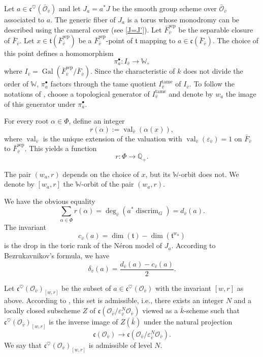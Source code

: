 \documentclass[12pt,english]{smfart}
\numberwithin{equation}{subsection}
\theoremstyle{remark}
\begin{document}
Let $a\in\mathfrak{c}^\heartsuit(\bar{\mathcal{O}}_{\bar{v}})$ and let $J_a=a^*J$ be the smooth group scheme over $\bar{\mathcal{O}}_{\bar{v}}$ associated to $a$. The generic fiber of $J_a$ is a torus whose monodromy can be described using the cameral cover (see \ref{J=J'}). Let $\bar F_{\bar{v}}^{\mathrm{sep}}$ be the separable closure of $\bar F_{\bar{v}}$. Let $x\in \mathfrak{t}(\bar F_{\bar{v}}^{\mathrm{sep}})$ be a $\bar F_{\bar{v}}^{\mathrm{sep}}$-point of $\mathfrak{t}$ mapping to $a\in \mathfrak{c}(\bar F_{\bar{v}})$. The choice of this point defines a homomorphism
$$\pi_a^\bullet: I_{\bar{v}} \longrightarrow \mathbb{W},$$
where $I_{\bar{v}}=\operatorname{Gal}(\bar F_{\bar{v}}^{\mathrm{sep}}/\bar F_{\bar{v}})$. Since the characteristic of $k$ does not divide the order of $\mathbb{W}$, $\pi_a^\bullet$ factors through the tame quotient $I_{\bar{v}}^{\mathrm{tame}}$ of $I_{\bar{v}}$. To follow the notations of \cite{GKM-codim}, choose a topological generator of $I_{\bar{v}}^{\mathrm{tame}}$ and denote by $w_a$ the image of this generator under $\pi_a^\bullet$.

For every root $\alpha\in \Phi$, define an integer
$$r(\alpha):=\operatorname{val}_{\bar{v}}(\alpha(x)),$$
where $\operatorname{val}_{\bar{v}}$ is the unique extension of the valuation with $\operatorname{val}_{\bar{v}}(\varepsilon_{\bar{v}})=1$ on $\bar F_{\bar{v}}$ to $\bar F_{\bar{v}}^{\mathrm{sep}}$. This yields a function 
$$r:\Phi\rightarrow \mathbb{Q}_+.$$

The pair $(w_a,r)$ depends on the choice of $x$, but its $\mathbb{W}$-orbit does not. We denote by $[w_a,r]$ the $\mathbb{W}$-orbit of the pair $(w_a,r)$.

We have the obvious equality
$$\sum_{\alpha\in \Phi} r(\alpha)=\deg_{\bar{v}}(a^*\operatorname{discrim}_G)=d_{\bar{v}}(a).$$
The invariant
$$c_{\bar{v}}(a)=\dim(\mathfrak{t})-\dim(\mathfrak{t}^{w_a})$$
is the drop in the toric rank of the N\'eron model of $J_a$. According to Bezrukavnikov's formula, we have
$$\delta_{\bar{v}}(a)=\frac{d_{\bar{v}}(a)-c_{\bar{v}}(a)}{2}.$$

Let $\mathfrak{c}^\heartsuit(\mathcal{O}_{\bar{v}})_{[w,r]}$ be the subset of $a\in\mathfrak{c}^\heartsuit(\mathcal{O}_{\bar{v}})$ with the invariant $[w,r]$ as above. According to \cite{GKM-codim}, this set is admissible, i.e., there exists an integer $N$ and a locally closed subscheme $Z$ of $\mathfrak{c}(\mathcal{O}_{\bar{v}}/\varepsilon_{\bar{v}}^N\mathcal{O}_{\bar{v}})$ viewed as a $\bar{k}$-scheme such that $\mathfrak{c}^\heartsuit(\mathcal{O}_{\bar{v}})_{[w,r]}$ is the inverse image of $Z(\bar{k})$ under the natural projection 
$$\mathfrak{c}(\mathcal{O}_{\bar{v}})\rightarrow \mathfrak{c}(\mathcal{O}_{\bar{v}}/\varepsilon_{\bar{v}}^N\mathcal{O}_{\bar{v}}).$$
We say that $\mathfrak{c}^\heartsuit(\mathcal{O}_{\bar{v}})_{[w,r]}$ is admissible of level $N$.
\end{document}
